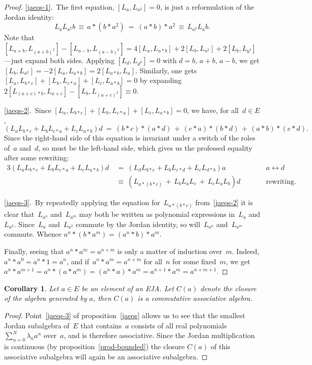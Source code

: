 \documentclass[submission,copyright,creativecommons]{eptcs}
\newcounter{main}
\newtheorem{corollary}[main]{Corollary}
\theoremstyle{definition}
\begin{document}
\begin{proof}
\ref{jaeqs-1}.\ 
The first equation, $[L_a,L_{a^2}]=0$,
is just a reformulation
of the Jordan identity:
\begin{equation*}
		L_aL_{a^2}b\,\equiv\, a*(b*a^2) \ =\  (a*b)*a^2
	\,\equiv\, L_{a^2}L_a b.
\end{equation*}
Note that $[L_{a+b},L_{(a+b)^2}]-
[L_{a-b},L_{(a-b)^2}] = 
4[L_a,L_{a*b}] + 2[L_b,L_{a^2}] + 2[L_b,L_{b^2}]$---just expand both sides.
Applying
$[L_d,L_{d^2}]=0$ with $d=b, \,a+b,\, a-b$,
we get  $[L_b,L_{a^2}]
	= -2[L_{a},L_{a*b}]=2[L_{a*b},L_a]$.
Similarly, one gets
$[L_a,L_{b*c}] + [L_b,L_{c*a}] + [L_c,L_{a*b}] = 0$
by expanding
	$2[L_{(a+c)*b},L_{a+c}]-[L_b,L_{(a+c)^2}]\equiv 0$.

\ref{jaeqs-2}.\ 
Since $[L_a,L_{b*c}] + [L_b,L_{c*a}] + [L_c,L_{a*b}] = 0$,
we have, for all~$d\in E$,
\begin{equation*}
	(L_a L_{b*c}  +
	L_b L_{c*a} +
	L_c L_{a*b})d \ = \ 
(b*c)*(a*d)\,+\,
(c*a)*(b*d)\,+\,
(a*b)*(c*d).
\end{equation*}
Since the right-hand side 
of this equation is invariant under a switch of the roles 
of~$a$ and~$d$,
so must be the left-hand side,
which gives us the professed equality after some rewriting:
\begin{alignat*}{3}
(L_a L_{b*c}  +
L_b L_{c*a} +
L_c L_{a*b})d \ &= \ 
(L_d L_{b*c}  +
L_b L_{c*d} +
	L_c L_{d*b})a\qquad&& a \leftrightarrow d\\
\ &\equiv \ (L_{a*(b*c)}\,+\,
L_bL_aL_c \,+\,
	L_cL_aL_b)d\qquad&&\text{rewriting}.
\end{alignat*}

\ref{jaeqs-3}.\ 
By repeatedly applying the equation for~$L_{a*(b*c)}$
from~\ref{jaeqs-2}
it is clear that~$L_{a^n}$
and~$L_{a^m}$
may both be written as polynomial
expressions
in~$L_{a}$ and $L_{a^2}$.
Since~$L_a$ and~$L_{a^2}$ commute
by the Jordan identity,
so will~$L_{a^n}$ and~$L_{a^m}$ commute.
Whence $a^n *(b* a^m) = (a^n * b)*a^m$.

Finally, seeing that $a^n*a^m=a^{n+m}$ is only a matter of induction over~$m$.
Indeed, $a^n*a^0=a^n*1=a^n$,
and if~$a^n*a^m=a^{n+m}$ for all~$n$ for some fixed~$m$,
we get $a^n*a^{m+1}
= a^n*(a*a^m)=(a^n*a)*a^m=a^{n+1}*a^m=a^{n+m+1}$.
\end{proof}

\begin{corollary}\label{cor:assocalg}
    Let $a\in E$ be an element of an EJA. Let $C(a)$ denote the closure of the algebra generated by $a$, then $C(a)$ is a commutative associative algebra.
\end{corollary}
\begin{proof}
Point~\ref{jaeqs-3} of proposition~\ref{jaeqs}
allows us to see that the smallest Jordan subalgebra of~$E$
that contains~$a$
consists of all real polynomials $\sum_{n=0}^N \lambda_n a^n$ over~$a$,
and is therefore associative.
Since the Jordan multiplication is continuous 
(by proposition~\ref{prod-bounded}) 
the closure $C(a)$ of this associative subalgebra
will again be an associative subalgebra.
\end{proof}
\end{document}
